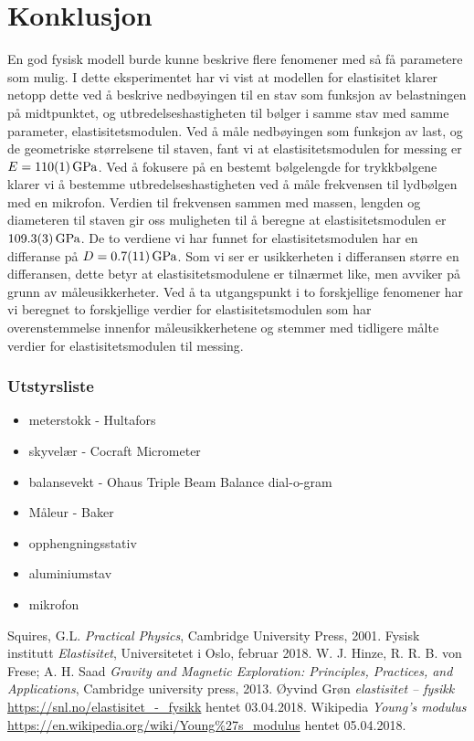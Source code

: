 \documentclass[%
 reprint,
 amsmath,amssymb,
 aps,
 norsk,
 booktabs
]{revtex4-1}
\begin{document}
\section{Konklusjon}
En god fysisk modell burde kunne beskrive flere fenomener med så få parametere som mulig. I dette eksperimentet har vi vist at modellen for elastisitet klarer netopp dette ved å beskrive nedbøyingen til en stav som funksjon av belastningen på midtpunktet, og utbredelseshastigheten til bølger i samme stav med samme parameter, elastisitetsmodulen.
Ved å måle nedbøyingen som funksjon av last, og de geometriske størrelsene til staven, fant vi at elastisitetsmodulen for messing er $E=\SI{110\pm1}{\giga\pascal}$.
Ved å fokusere på en bestemt bølgelengde for trykkbølgene klarer vi å bestemme utbredelseshastigheten ved å måle frekvensen til lydbølgen med en mikrofon. Verdien til frekvensen sammen med massen, lengden og diameteren til staven gir oss muligheten til å beregne at elastisitetsmodulen er $\SI{109.3\pm0.3}{\giga\pascal}$.
De to verdiene vi har funnet for elastisitetsmodulen har en differanse på $D = \SI{0.7\pm1.1}{\giga\pascal}$. Som vi ser er usikkerheten i differansen større en differansen, dette betyr at elastisitetsmodulene er tilnærmet like, men avviker på grunn av måleusikkerheter. Ved å ta utgangspunkt i to forskjellige fenomener har vi beregnet to forskjellige verdier for elastisitetsmodulen som har overenstemmelse innenfor måleusikkerhetene og stemmer med tidligere målte verdier for elastisitetsmodulen til messing.
\subsubsection*{Utstyrsliste}
\begin{itemize}
\label{utstyr}
\item meterstokk - Hultafors
\item skyvelær - Cocraft Micrometer
\item balansevekt - Ohaus Triple Beam Balance dial-o-gram
\item Måleur - Baker
\item opphengningsstativ
\item aluminiumstav
\item mikrofon
\end{itemize}
\begin{thebibliography}{9}
Squires, G.L. \emph{Practical Physics}, Cambridge University Press, 2001.
Fysisk institutt \emph{Elastisitet}, Universitetet i Oslo, februar 2018.
W. J. Hinze, R. R. B. von Frese; A. H. Saad \emph{Gravity and Magnetic Exploration: Principles, Practices, and Applications}, Cambridge university press, 2013.
Øyvind Grøn \emph{elastisitet – fysikk} \url{https://snl.no/elastisitet_-_fysikk} hentet 03.04.2018.
Wikipedia \emph{Young's modulus} \url{https://en.wikipedia.org/wiki/Young%27s_modulus} hentet 05.04.2018.
\end{thebibliography}
\end{document}
